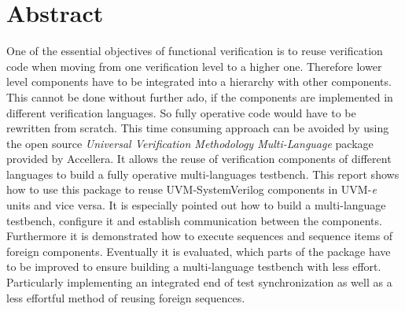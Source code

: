 \section*{Abstract}
One of the essential objectives of functional verification is to reuse verification code when moving from one verification level to a higher one. Therefore lower level components have to be integrated into a hierarchy with other components. This cannot be done without further ado, if the components are implemented in different verification languages. So fully operative code would have to be rewritten from scratch. This time consuming approach can be avoided by using the open source \emph{Universal Verification Methodology Multi-Language} package provided by Accellera. It allows the reuse of verification components of different languages to build a fully operative multi-languages testbench. This report shows how to use this package to reuse UVM-SystemVerilog components in UVM-\textit{e} units and vice versa. It is especially pointed out how to build a multi-language testbench, configure it and establish communication between the components. Furthermore it is demonstrated how to execute sequences and sequence items of foreign components. Eventually it is evaluated, which parts of the package have to be improved to ensure building a multi-language testbench with less effort. Particularly implementing an integrated end of test synchronization as well as a less effortful method of reusing foreign sequences.